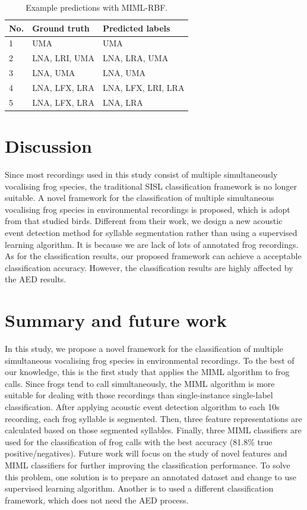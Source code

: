 \begin{table}[htb!]
\centering
\caption{Example predictions with MIML-RBF.}
\label{tab:prediction}
\begin{tabular}{lll}
\hline\hline
{\bf No.} &{\bf Ground truth} & {\bf Predicted labels} \\ \hline
1&UMA                & UMA                    \\ 
2&LNA, LRI, UMA      & LNA, LRA, UMA          \\ 
3&LNA, UMA           & LNA, UMA               \\ 
4&LNA, LFX, LRA      & LNA, LFX, LRI, LRA     \\ 
5&LNA, LFX, LRA      & LNA, LRA               \\ \hline\hline
\end{tabular}
\end{table}



\section{Discussion}
Since most recordings used in this study consist of multiple simultaneously vocalising frog species, the traditional SISL classification framework is no longer suitable. A novel framework for the classification of multiple simultaneous vocalising frog species in environmental recordings is proposed, which is adopt from \cite{briggs2012acoustic} that studied birds. Different from their work, we design a new acoustic event detection method for syllable segmentation rather than using a supervised learning algorithm. It is because we are lack of lots of annotated frog recordings. As for the classification results, our proposed framework can achieve a acceptable classification accuracy. However, the classification results are highly affected by the AED results. 


\section{Summary and future work}
In this study, we propose a novel framework for the classification of multiple simultaneous vocalising frog species in environmental recordings. To the best of our knowledge, this is the first study that applies the MIML algorithm to frog calls. Since frogs tend to call simultaneously, the MIML algorithm is more suitable for dealing with those recordings than single-instance single-label classification. After applying acoustic event detection algorithm to each 10s recording, each frog syllable is segmented. Then, three feature representations are calculated based on those segmented syllables. Finally, three MIML classifiers are used for the classification of frog calls with the best accuracy (81.8\% true positive/negatives). Future work will focus on the study of novel features and MIML classifiers for further improving the classification performance. To solve this problem, one solution is to prepare an annotated dataset and change to use supervised learning algorithm. Another is to used a different classification framework, which does not need the AED process.  



